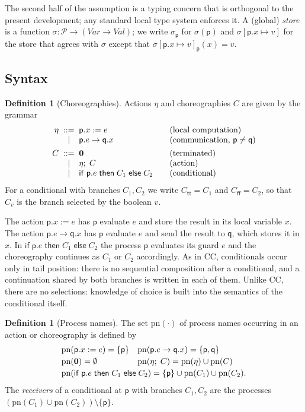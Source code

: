 \documentclass[11pt]{article}
\theoremstyle{plain}
\theoremstyle{definition}
\newtheorem{definition}[theorem]{Definition}
\theoremstyle{remark}
\newcommand{\kw}[1]{\mathsf{#1}}
\newcommand{\kif}{\kw{if}\;}
\newcommand{\kthen}{\;\kw{then}\;}
\newcommand{\kelse}{\;\kw{else}\;}
\newcommand{\nil}{\mathbf{0}}
\newcommand{\ttrue}{\mathsf{tt}}
\newcommand{\ffalse}{\mathsf{ff}}
\newcommand{\seq}{;\;}
\newcommand{\pp}{\mathsf{p}}
\newcommand{\qq}{\mathsf{q}}
\newcommand{\Procs}{\mathcal{P}}
\newcommand{\Var}{\mathit{Var}}
\newcommand{\Val}{\mathit{Val}}
\newcommand{\pn}{\mathrm{pn}}
\newcommand{\upd}[3]{#1[#2 \mapsto #3]}
\newcommand{\ifcond}[3]{\kif #1 \kthen #2 \kelse #3}
\begin{document}
\noindent
The second half of the assumption is a typing concern that is orthogonal to the
present development; any standard local type system enforces it.  A (global)
\emph{store} is a function $\sigma : \Procs \to (\Var \to \Val)$; we write
$\sigma_\pp$ for $\sigma(\pp)$ and $\upd{\sigma}{\pp.x}{v}$ for the store that
agrees with $\sigma$ except that $\upd{\sigma}{\pp.x}{v}_\pp(x) = v$.

\subsection{Syntax}

\begin{definition}[Choreographies]\label{def:chor-syntax}
  Actions $\eta$ and choreographies $C$ are given by the grammar
  \[
  \begin{array}{r@{\;\;}c@{\;\;}l@{\qquad}l}
    \eta & ::= & \pp.x := e & \text{(local computation)}\\
         & \mid & \pp.e \to \qq.x & \text{(communication, $\pp \neq \qq$)}\\[1ex]
    C & ::= & \nil & \text{(terminated)}\\
      & \mid & \eta \seq C & \text{(action)}\\
      & \mid & \ifcond{\pp.e}{C_1}{C_2} & \text{(conditional)}
  \end{array}
  \]
  For a conditional with branches $C_1, C_2$ we write $C_\ttrue = C_1$ and
  $C_\ffalse = C_2$, so that $C_v$ is the branch selected by the boolean $v$.
\end{definition}

The action $\pp.x := e$ has $\pp$ evaluate $e$ and store the result in its
local variable $x$.  The action $\pp.e \to \qq.x$ has $\pp$ evaluate $e$ and
send the result to $\qq$, which stores it in $x$.  In
$\ifcond{\pp.e}{C_1}{C_2}$ the process $\pp$ evaluates its guard $e$ and the
choreography continues as $C_1$ or $C_2$ accordingly.  As in CC, conditionals
occur only in tail position: there is no sequential composition after a
conditional, and a continuation shared by both branches is written in each of
them.  Unlike CC, there are no selections: knowledge of choice is built into
the semantics of the conditional itself.

\begin{definition}[Process names]\label{def:pn}
  The set $\pn(\cdot)$ of process names occurring in an action or
  choreography is defined by
  \[
  \begin{array}{l@{\quad}l}
    \pn(\pp.x := e) = \{\pp\} &
    \pn(\pp.e \to \qq.x) = \{\pp,\qq\}\\[0.5ex]
    \pn(\nil) = \emptyset &
    \pn(\eta \seq C) = \pn(\eta) \cup \pn(C)\\[0.5ex]
    \multicolumn{2}{l}{
    \pn(\ifcond{\pp.e}{C_1}{C_2}) = \{\pp\}\cup\pn(C_1)\cup\pn(C_2).}
  \end{array}
  \]
  The \emph{receivers} of a conditional at $\pp$ with branches $C_1,C_2$ are
  the processes $(\pn(C_1)\cup\pn(C_2)) \setminus \{\pp\}$.
\end{definition}
\end{document}
